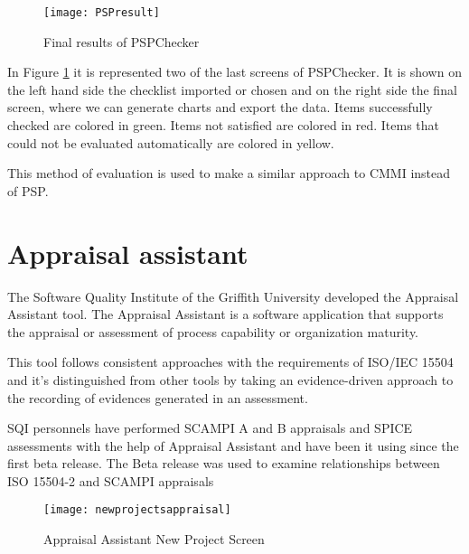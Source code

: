 \begin{figure}[h]
	\begin{center}
		\leavevmode
		\texttt{[image: PSPresult]}
		\caption{Final results of PSPChecker}
		\label{fig:PSPresults}
	\end{center}
\end{figure}

In Figure \ref{fig:PSPresults} it is represented two of the last screens of PSPChecker. It is shown on the left hand side the checklist imported or chosen and on the right side the final screen, where we can generate charts and export the data. 
Items successfully checked are colored in green. Items not satisfied are colored in red. Items that could not be evaluated automatically are colored in yellow.

This method of evaluation is used to make a similar approach to CMMI instead of PSP.

\section{Appraisal assistant}

The Software Quality Institute of the Griffith University 	\citep{SoftwareQuality2015} developed the Appraisal Assistant tool. The Appraisal Assistant \citep{Appraisal2015} is a software application that supports the appraisal or assessment of process capability or organization maturity.

This tool follows consistent approaches with the requirements of ISO/IEC 15504 \citep{ISOIEC} and it's distinguished from other tools by taking an evidence-driven approach to the recording of evidences generated in an assessment.

SQI personnels have performed SCAMPI A and B appraisals and SPICE assessments with the help of Appraisal Assistant and have been it using since the first beta release. The Beta release was used to examine relationships between ISO 15504-2 and SCAMPI appraisals

\begin{figure}[h]
	\begin{center}
		\leavevmode
		\texttt{[image: newprojectsappraisal]}
		\caption{Appraisal Assistant New Project Screen}
		\label{fig:newprojectsappraisal}
	\end{center}
\end{figure}

